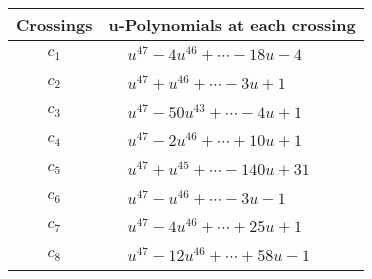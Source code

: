 \documentclass[1p]{elsarticle_modified}
\theoremstyle{definition}
\begin{document}
\begin{tabular}{m{50pt}|m{274pt}}
Crossings & \hspace{64pt}u-Polynomials at each crossing \\
\hline $$\begin{aligned}c_{1}\end{aligned}$$&$\begin{aligned}
&u^{47}-4 u^{46}+\cdots-18 u-4
\end{aligned}$\\
\hline $$\begin{aligned}c_{2}\end{aligned}$$&$\begin{aligned}
&u^{47}+u^{46}+\cdots-3 u+1
\end{aligned}$\\
\hline $$\begin{aligned}c_{3}\end{aligned}$$&$\begin{aligned}
&u^{47}-50 u^{43}+\cdots-4 u+1
\end{aligned}$\\
\hline $$\begin{aligned}c_{4}\end{aligned}$$&$\begin{aligned}
&u^{47}-2 u^{46}+\cdots+10 u+1
\end{aligned}$\\
\hline $$\begin{aligned}c_{5}\end{aligned}$$&$\begin{aligned}
&u^{47}+u^{45}+\cdots-140 u+31
\end{aligned}$\\
\hline $$\begin{aligned}c_{6}\end{aligned}$$&$\begin{aligned}
&u^{47}- u^{46}+\cdots-3 u-1
\end{aligned}$\\
\hline $$\begin{aligned}c_{7}\end{aligned}$$&$\begin{aligned}
&u^{47}-4 u^{46}+\cdots+25 u+1
\end{aligned}$\\
\hline $$\begin{aligned}c_{8}\end{aligned}$$&$\begin{aligned}
&u^{47}-12 u^{46}+\cdots+58 u-1
\end{aligned}$\\

\end{tabular}
\end{document}
